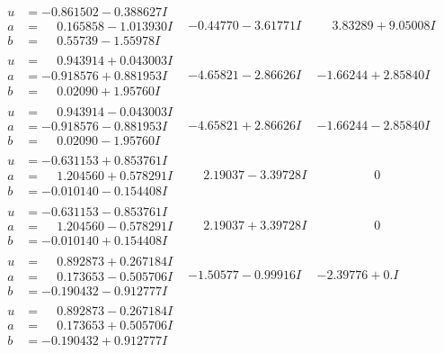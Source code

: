 \documentclass[1p]{elsarticle_modified}
\theoremstyle{definition}
\begin{document}
$$\begin{array}{c|c|c}
\begin{aligned}
u &= -0.861502 - 0.388627 I \\
a &= \phantom{-}0.165858 - 1.013930 I \\
b &= \phantom{-}0.55739 - 1.55978 I\end{aligned}
 & -0.44770 - 3.61771 I & \phantom{-}3.83289 + 9.05008 I \\ \hline\begin{aligned}
u &= \phantom{-}0.943914 + 0.043003 I \\
a &= -0.918576 + 0.881953 I \\
b &= \phantom{-}0.02090 + 1.95760 I\end{aligned}
 & -4.65821 - 2.86626 I & -1.66244 + 2.85840 I \\ \hline\begin{aligned}
u &= \phantom{-}0.943914 - 0.043003 I \\
a &= -0.918576 - 0.881953 I \\
b &= \phantom{-}0.02090 - 1.95760 I\end{aligned}
 & -4.65821 + 2.86626 I & -1.66244 - 2.85840 I \\ \hline\begin{aligned}
u &= -0.631153 + 0.853761 I \\
a &= \phantom{-}1.204560 + 0.578291 I \\
b &= -0.010140 - 0.154408 I\end{aligned}
 & \phantom{-}2.19037 - 3.39728 I & \phantom{-0.000000 } 0 \\ \hline\begin{aligned}
u &= -0.631153 - 0.853761 I \\
a &= \phantom{-}1.204560 - 0.578291 I \\
b &= -0.010140 + 0.154408 I\end{aligned}
 & \phantom{-}2.19037 + 3.39728 I & \phantom{-0.000000 } 0 \\ \hline\begin{aligned}
u &= \phantom{-}0.892873 + 0.267184 I \\
a &= \phantom{-}0.173653 - 0.505706 I \\
b &= -0.190432 - 0.912777 I\end{aligned}
 & -1.50577 - 0.99916 I & -2.39776 + 0. I\phantom{ +0.000000I} \\ \hline\begin{aligned}
u &= \phantom{-}0.892873 - 0.267184 I \\
a &= \phantom{-}0.173653 + 0.505706 I \\
b &= -0.190432 + 0.912777 I\end{aligned}

\end{array}$$
\end{document}
